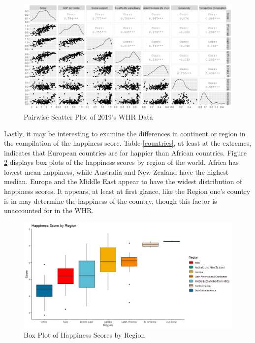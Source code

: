 \documentclass{article}
\begin{document}
\begin{figure}[h]
    \centering
    \includegraphics[width=\linewidth]{hap19_pairs.png}
    \caption{Pairwise Scatter Plot of 2019's WHR Data}
    \label{hap19pairs}
\end{figure}

Lastly, it may be interesting to examine the differences in continent or region in the compilation of the happiness score. Table \ref{countries}, at least at the extremes, indicates that European countries are far happier than African countries. Figure \ref{hapbox} displays box plots of the happiness scores by region of the world. Africa has lowest mean happiness, while Australia and New Zealand have the highest median. Europe and the Middle East appear to have the widest distribution of happiness scores. It appears, at least at first glance, like the Region one's country is in may determine the happiness of the country, though this factor is unaccounted for in the WHR.

\begin{figure}[H]
    \centering
    \includegraphics[width=\linewidth]{hap_box.png}
    \caption{Box Plot of Happiness Scores by Region}
    \label{hapbox}
\end{figure}
\end{document}
